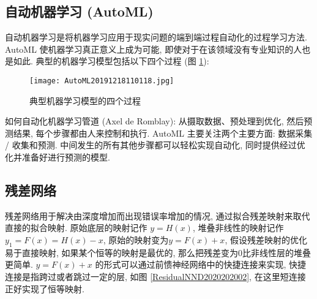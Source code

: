 \subsection{自动机器学习 (AutoML)}
自动机器学习是将机器学习应用于现实问题的端到端过程自动化的过程学习方法.
AutoML 使机器学习真正意义上成为可能, 即使对于在该领域没有专业知识的人也是如此.
典型的机器学习模型包括以下四个过程 (图 \ref{AutoML2019fig2702}):
\begin{figure}[H]
    \centering
    \texttt{[image: AutoML20191218110118.jpg]}
    \caption{典型机器学习模型的四个过程}
    \label{AutoML2019fig2702}
\end{figure}
如何自动化机器学习管道 (Axel de Romblay):
从摄取数据、预处理到优化, 然后预测结果, 每个步骤都由人来控制和执行.
AutoML 主要关注两个主要方面: 数据采集 / 收集和预测.
中间发生的所有其他步骤都可以轻松实现自动化, 同时提供经过优化并准备好进行预测的模型.
%
%
%
%
%
%
%
\subsection{残差网络}
残差网络用于解决由深度增加而出现错误率增加的情况, 通过拟合残差映射来取代直接的拟合映射.
原始底层的映射记作 $y=H(x)$, 堆叠非线性的映射记作 $y_1=F(x) = H(x) - x$, 原始的映射变为$y=F(x) + x$,
假设残差映射的优化易于直接映射, 如果某个恒等的映射是最优的, 那么把残差变为0比非线性层的堆叠更简单.
$y=F(x) + x$ 的形式可以通过前愦神经网络中的快捷连接来实现, 快捷连接是指跨过或者跳过一定的层,
如图 \ref{ResidualNND2020202002}, 在这里短连接正好实现了恒等映射.

